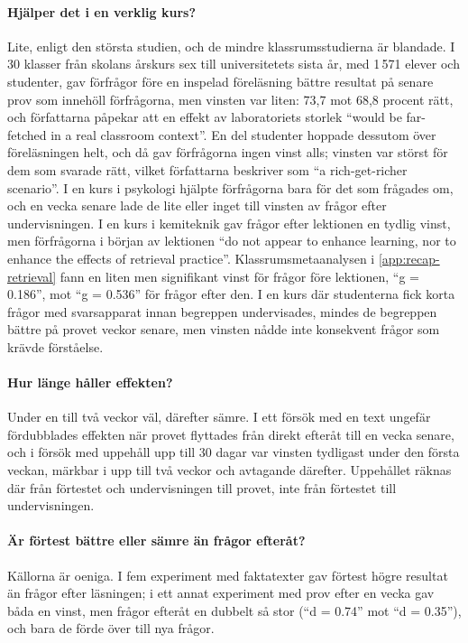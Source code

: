 \paragraph{Hjälper det i en verklig kurs?}
Lite, enligt den största studien, och de mindre klassrumsstudierna är
blandade.  I 30 klasser från skolans årskurs sex till universitetets
sista år, med 1\,571 elever och studenter, gav förfrågor före en
inspelad föreläsning bättre resultat på senare prov som innehöll
förfrågorna, men vinsten var liten: 73,7 mot 68,8 procent rätt, och
författarna påpekar att en effekt av laboratoriets storlek
\enquote{would be far-fetched in a real classroom
context}\autocite{Motz2026ManyClasses}.  En del studenter hoppade dessutom
över föreläsningen helt, och då gav förfrågorna ingen vinst alls; vinsten
var störst för dem som svarade rätt, vilket författarna beskriver som
\enquote{a rich-get-richer scenario}\autocite{Motz2026ManyClasses}.  I en kurs
i psykologi hjälpte förfrågorna
bara för det som frågades om, och en vecka senare lade de lite eller
inget till vinsten av frågor efter
undervisningen\autocite{Carpenter2018Prequestions}.
I en kurs i kemiteknik gav frågor efter lektionen en tydlig vinst, men
förfrågorna i början av lektionen \enquote{do not appear to enhance
learning, nor to enhance the effects of retrieval
practice}\autocite{Geller2017Prequestions}.  Klassrumsmetaanalysen i
\cref{app:recap-retrieval} fann en liten men signifikant vinst för frågor
före lektionen, \enquote{g = 0.186}, mot \enquote{g = 0.536} för frågor
efter den\autocite{Yang2021Testing}.  I en kurs där studenterna fick
korta frågor med svarsapparat innan begreppen undervisades, mindes de
begreppen bättre på provet veckor senare, men vinsten nådde inte
konsekvent frågor som krävde förståelse\autocite{Pan2019Jargon}.

\paragraph{Hur länge håller effekten?}
Under en till två veckor väl, därefter sämre.  I ett försök med en
text ungefär fördubblades effekten när provet flyttades från direkt
efteråt till en vecka senare\autocite{Kliegl2024Pretesting}, och i
försök med uppehåll upp till 30 dagar var vinsten tydligast under den
första veckan, märkbar i upp till två veckor och avtagande
därefter\autocite{Pan2026Temporal}.  Uppehållet räknas där från förtestet
och undervisningen till provet, inte från förtestet till undervisningen.

\paragraph{Är förtest bättre eller sämre än frågor efteråt?}
Källorna är oeniga.  I fem experiment med faktatexter gav förtest
högre resultat än frågor efter läsningen\autocite{PanSana2021Pretesting};
i ett annat experiment med prov efter en vecka gav båda en vinst, men
frågor efteråt en dubbelt så stor (\enquote{d = 0.74} mot \enquote{d =
0.35}), och bara de förde över till nya
frågor\autocite{Latimier2019Pretesting}.

